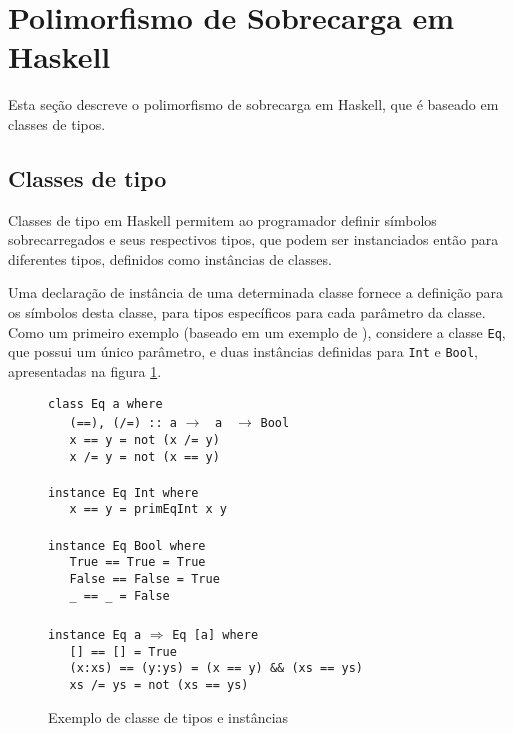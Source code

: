 \section{Polimorfismo de Sobrecarga em Haskell}\label{polhaskell}

Esta se\c{c}\~ao descreve o polimorfismo de sobrecarga em Haskell, que \'e baseado em classes de tipos.

\subsection{Classes de tipo}

Classes de tipo em Haskell \cite{Haskell98, Haskell07} permitem ao programador definir s\'imbolos 
sobrecarregados e seus respectivos tipos, que podem ser instanciados ent\~ao para diferentes tipos, definidos como 
inst\^ancias de classes.
 
Uma declara\c{c}\~ao de inst\^ancia de uma determinada classe 
fornece a defini\c{c}\~ao para os s\'imbolos desta classe, para tipos espec\'ificos para cada par\^ametro da classe.
Como um primeiro exemplo (baseado em um exemplo de \cite{Haskell07}), considere a classe 
\texttt{Eq}, que possui um \'unico par\^ametro, e duas inst\^ancias definidas para \texttt{Int} e 
\texttt{Bool}, apresentadas na figura \ref{fig6}.

\begin{figure}[h]
      \verb|class Eq a where|\\
      \verb|   (==), (/=) :: a| $\rightarrow$ \verb| a | $\rightarrow$ \verb|Bool|\\
      \verb|   x == y = not (x /= y)|\\
      \verb|   x /= y = not (x == y)|\\\\
      \verb|instance Eq Int where|\\
      \verb|   x == y = primEqInt x y|\\\\
      \verb|instance Eq Bool where|\\
      \verb|   True == True = True|\\
      \verb|   False == False = True|\\
      \verb|   _ == _ = False|\\\\   
      \verb|instance Eq a| $\Rightarrow$ \verb|Eq [a] where|\\
      \verb|   [] == [] = True|\\
      \verb|   (x:xs) == (y:ys) = (x == y) && (xs == ys)|\\
      \verb|   xs /= ys = not (xs == ys)|        
  \caption{Exemplo de classe de tipos e inst\^ancias}
  \label{fig6}
\end{figure} 

